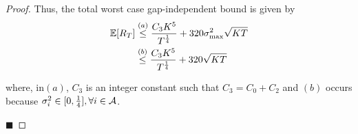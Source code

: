 \begin{proof}
Thus, the total worst case gap-independent bound is given by
	\begin{align*}
	\mathbb{E}[R_{T}] &\overset{(a)}{\leq}  \dfrac{C_3 K^5}{T^{\frac{1}{4}}} + 320\sigma_{\max}^2\sqrt{KT}\\
	&\overset{(b)}{\leq} \dfrac{C_3 K^5}{T^{\frac{1}{4}}} + 320\sqrt{KT}
	\end{align*}	
	
where, in$(a)$, $C_3$ is an integer constant such that $C_3 = C_0 + C_2 $ and $(b)$ occurs because $\sigma_i^2 \in [0,\frac{1}{4}], \forall i\in \mathcal{A}$.

\hfill $\blacksquare$	
\end{proof}

%
%
%
